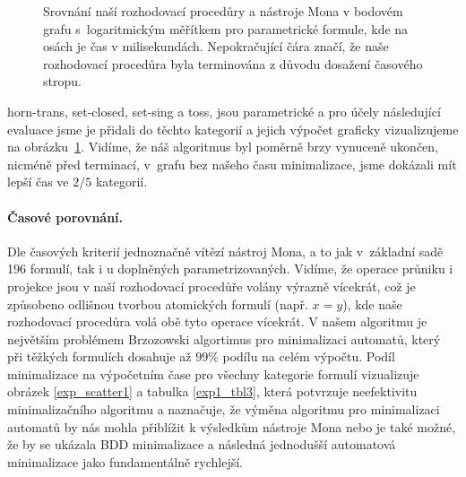 \begin{figure}
{
    }
    \caption{Srovnání naší rozhodovací procedůry a nástroje Mona v bodovém grafu s~logaritmickým měřítkem pro parametrické formule, kde na osách je čas v milisekundách. Nepokračující čára značí, že naše rozhodovací procedůra byla terminována z důvodu dosažení časového stropu.}
    \label{exp_scatter2}
\end{figure}

\noindent
horn-trans, set-closed, set-sing a toss, jsou parametrické a pro účely následující evaluace jsme je přidali do těchto kategorií a jejich výpočet graficky vizualizujeme na obrázku~\ref{exp_scatter2}. Vidíme, že náš algoritmus byl poměrně brzy vynuceně ukončen, nicméně před terminací, v~grafu bez našeho času minimalizace, jsme dokázali mít lepší čas ve $2/5$ kategorií.

\paragraph{Časové porovnání.} Dle časových kriterií jednoznačně vítězí nástroj Mona, a to jak v~základní sadě 196 formulí, tak i u doplněných parametrizovaných. Vidíme, že operace průniku i projekce jsou v naší rozhodovací procedůře volány výrazně vícekrát, což je způsobeno odlišnou tvorbou atomických formulí (např. $x = y$), kde naše rozhodovací procedůra volá obě tyto operace vícekrát. V našem algoritmu je největším problémem Brzozowski algortimus pro minimalizaci automatů, který při těžkých formulích dosahuje až $99\%$ podílu na celém výpočtu. Podíl minimalizace na výpočetním čase pro všechny kategorie formulí vizualizuje obrázek \ref{exp_scatter1} a tabulka \ref{exp1_tbl3}, která potvrzuje neefektivitu minimalizačního algoritmu a naznačuje, že výměna algoritmu pro minimalizaci automatů by nás mohla přiblížit k výsledkům nástroje Mona nebo je také možné, že by se ukázala BDD minimalizace a následná jednodušší automatová minimalizace jako fundamentálně rychlejší.

